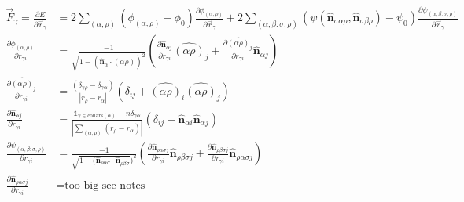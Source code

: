 \begin{align*}
    \vec{F}_\gamma = \frac{\partial E}{\partial \vec{r}_\gamma} &= 2 \sum_{(\alpha, \rho)} \left( \phi_{(\alpha,\rho)} - \phi_0 \right) \frac{\partial \phi_{(\alpha,\rho)}}{\partial \vec{r}_\gamma} + 2 \sum_{(\alpha, \beta: \sigma, \rho)} \left( \psi(\hat{\bm{n}}_{\sigma\alpha\rho}, \hat{\bm{n}}_{\sigma\beta\rho}) - \psi_0 \right) \frac{\partial \psi_{(\alpha, \beta: \sigma, \rho)}}{\partial \vec{r}_\gamma} \\
    \frac{\partial \phi_{(\alpha,\rho)}}{\partial r_{\gamma i}} &= \frac{-1}{\sqrt{1 - (\hat{\bm{n}}_\alpha \cdot \hat{(\alpha\rho)})^2}} \left(\frac{\partial \hat{\bm{n}}_{\alpha j}}{\partial r_{\gamma i}} \hat{(\alpha\rho)}_j + \frac{\partial \hat{(\alpha\rho)}_j}{\partial r_{\gamma i}} \hat{\bm{n}}_{\alpha j} \right) \\
    \frac{\partial \hat{(\alpha\rho)}_j}{\partial r_{\gamma i}} &= \frac{(\delta_{\gamma\rho} - \delta_{\gamma\alpha})}{|r_\rho - r_\alpha|} \left( \delta_{ij} + \hat{(\alpha\rho)}_i\hat{(\alpha\rho)}_j \right) \\
    \frac{\partial \hat{\bm{n}}_{\alpha j}}{\partial r_{\gamma i}} &= \frac{\mathbb{1}_{\gamma\in \text{collars}(\alpha)} - n\delta_{\gamma\alpha}}{\left| \sum_{(\alpha, \rho)} (r_\rho - r_\alpha) \right|} \left(\delta_{ij} - \hat{\bm{n}}_{\alpha i} \hat{\bm{n}}_{\alpha j} \right) \\
    \frac{\partial \psi_{(\alpha, \beta: \sigma, \rho)}}{\partial r_{\gamma i}} &= \frac{-1}{\sqrt{1 - (\hat{\bm{n}}_{\rho\alpha\sigma} \cdot \hat{\bm{n}}_{\rho\beta\sigma}})^2} \left(\frac{\partial \hat{\bm{n}}_{\rho\alpha\sigma j}}{\partial r_{\gamma i}} \hat{\bm{n}}_{\rho\beta\sigma j} + \frac{\partial \hat{\bm{n}}_{\rho\beta\sigma j}}{\partial r_{\gamma i}} \hat{\bm{n}}_{\rho\alpha\sigma j} \right) \\
    \frac{\partial \hat{\bm{n}}_{\rho\alpha\sigma j}}{\partial r_{\gamma i}} &= \text{too big see notes}
\end{align*}
